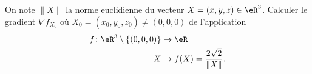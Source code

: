 
\begin{exercice}\label{exoOutilsMath-0138}

    On note \( \| X \|\) la norme euclidienne du vecteur \( X=(x,y,z)\in \eR^3\). Calculer le gradient \( \nabla f_{X_0}\) où \( X_0=(x_0,y_0,z_0)\neq (0,0,0)\) de l'application
    \begin{equation}
        \begin{aligned}
            f\colon \eR^3\setminus\{ (0,0,0) \}&\to \eR \\
            X&\mapsto f(X)=\frac{ 2\sqrt{2} }{ \| X \| }. 
        \end{aligned}
    \end{equation}

\end{exercice}
